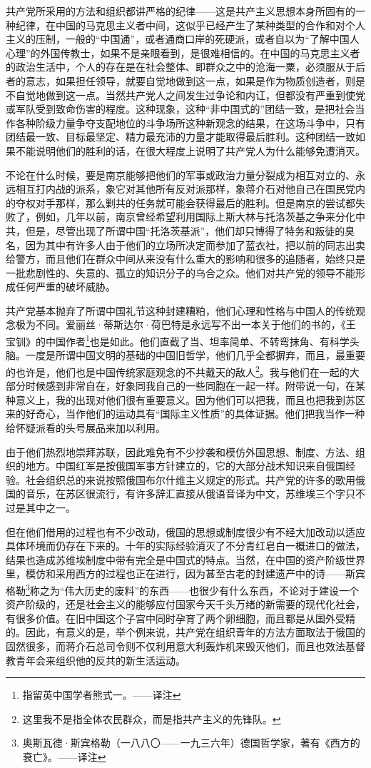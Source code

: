 \documentclass[10pt]{book}
\begin{document}
共产党所采用的方法和组织都讲严格的纪律——这是共产主义思想本身所固有的一种纪律，在中国的马克思主义者中间，这似乎已经产生了某种类型的合作和对个人主义的压制，一般的“中国通”，或者通商口岸的死硬派，或者自以为“了解中国人心理”的外国传教士，如果不是亲眼看到，是很难相信的。在中国的马克思主义者的政治生活中，个人的存在是在社会整体、即群众之中的沧海一粟，必须服从于后者的意志，如果担任领导，就要自觉地做到这一点，如果是作为物质创造者，则是不自觉地做到这一点。当然共产党人之间发生过争论和内讧，但都没有严重到使党或军队受到致命伤害的程度。这种现象，这种“非中国式的”团结一致，是把社会当作各种阶级力量争夺支配地位的斗争场所这种新观念的结果，在这场斗争中，只有团结最一致、目标最坚定、精力最充沛的力量才能取得最后胜利。这种团结一致如果不能说明他们的胜利的话，在很大程度上说明了共产党人为什么能够免遭消灭。

不论在什么时候，要是南京能够把他们的军事或政治力量分裂成为相互对立的、永远相互打内战的派系，象它对其他所有反对派那样，象蒋介石对他自己在国民党内的夺权对手那样，那么剿共的任务就可能会获得最后的胜利。但是南京的尝试都失败了，例如，几年以前，南京曾经希望利用国际上斯大林与托洛茨基之争来分化中共，但是，尽管出现了所谓中国“托洛茨基派”，他们却只博得了特务和叛徒的臭名，因为其中有许多人由于他们的立场所决定而参加了蓝衣社，把以前的同志出卖给警方，而且他们在群众中间从来没有什么重大的影响和很多的追随者，始终只是一批悲剧性的、失意的、孤立的知识分子的乌合之众。他们对共产党的领导不能形成任何严重的破坏威胁。

共产党基本抛弃了所谓中国礼节这种封建糟粕，他们心理和性格与中国人的传统观念极为不同。爱丽丝·蒂斯达尔·荷巴特是永远写不出一本关于他们的书的，《王宝钏》的中国作者\footnote{指留英中国学者熊式一。——译注}也是如此。他们直截了当、坦率简单、不转弯抹角、有科学头脑。一度是所谓中国文明的基础的中国旧哲学，他们几乎全都摒弃，而且，最重要的也许是，他们也是中国传统家庭观念的不共戴天的敌人\footnote{这里我不是指全体农民群众，而是指共产主义的先锋队。}。我与他们在一起的大部分时候感到非常自在，好象同我自己的一些同胞在一起一样。附带说一句，在某种意义上，我的出现对他们很有重要意义。因为他们可以把我，而且也把我到苏区来的好奇心，当作他们的运动具有“国际主义性质”的具体证据。他们把我当作一种给怀疑派看的头号展品来加以利用。

由于他们热烈地崇拜苏联，因此难免有不少抄袭和模仿外国思想、制度、方法、组织的地方。中国红军是按俄国军事方针建立的，它的大部分战术知识来自俄国经验。社会组织总的来说按照俄国布尔什维主义规定的形式。共产党的许多的歌用俄国的音乐，在苏区很流行，有许多辞汇直接从俄语音译为中文，苏维埃三个字只不过是其中之一。

但在他们借用的过程也有不少改动，俄国的思想或制度很少有不经大加改动以适应具体环境而仍存在下来的。十年的实际经验消灭了不分青红皂白一概进口的做法，结果也造成苏维埃制度中带有完全是中国式的特点。当然，在中国的资产阶级世界里，模仿和采用西方的过程也正在进行，因为甚至古老的封建遗产中的诗——斯宾格勒\footnote{奥斯瓦德·斯宾格勒（一八八〇——一九三六年）德国哲学家，著有《西方的衰亡》。——译注}称之为“伟大历史的废料”的东西——也很少有什么东西，不论对于建设一个资产阶级的，还是社会主义的能够应付国家今天千头万绪的新需要的现代化社会，有很多价值。在旧中国这个子宫中同时孕育了两个卵细胞，而且都是从国外受精的。因此，有意义的是，举个例来说，共产党在组织青年的方法方面取法于俄国的固然很多，而蒋介石总司令则不仅利用意大利轰炸机来毁灭他们，而且也效法基督教青年会来组织他的反共的新生活运动。
\end{document}
